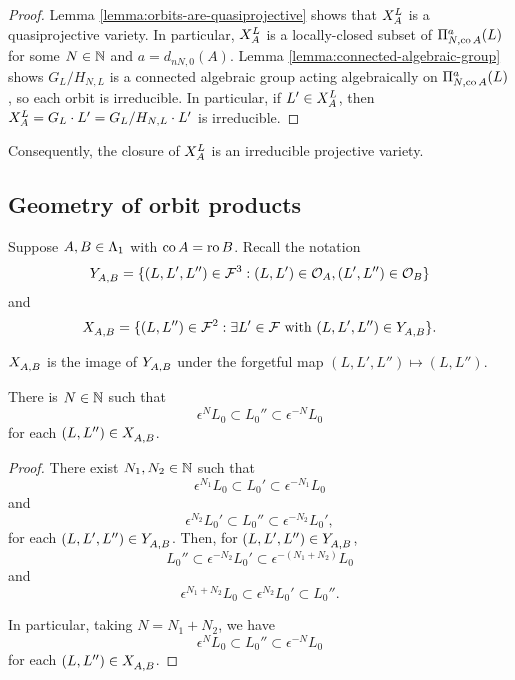 \documentclass[a4paper, 11pt]{report}
\begin{document}
\begin{proof}
Lemma \ref{lemma:orbits-are-quasiprojective} shows that $\xprod[L]{A}$ is a quasiprojective variety. In particular, $\xprod[L]{A}$ is a locally-closed subset of $\Pi_{N,\co{A}}^a(L)$ for some $N\in\naturals$ and $a=d_{nN,0}(A)$. Lemma \ref{lemma:connected-algebraic-group} shows $G_L/{H_{N,L}}$ is a connected algebraic group acting algebraically on $\Pi_{N,\co{A}}^a(L)$, so each orbit is irreducible. In particular, if $L'\in\xprod[L]{A}$, then $\xprod[L]{A}=G_L\cdot L'=G_L/{H_{N,L}}\cdot L'$ is irreducible.
\end{proof}

Consequently, the closure of $\xprod[L]{A}$ is an irreducible projective variety.

\subsection{Geometry of orbit products}

Suppose $A,B\in\matrices$ with $\co{A}=\ro{B}$. Recall the notation
\begin{equation*}
\yprod{A,B} = \{(L,L',L'')\in\flags^3: (L,L')\in\orbit{A}, (L',L'')\in\orbit{B}\}
\end{equation*}
and
\begin{equation*}
\xprod{A,B} = \{(L,L'')\in\flags^2:\exists L'\in\flags \text{ with } (L,L',L'')\in \yprod{A,B}\}.
\end{equation*}

$\xprod{A,B}$ is the image of $\yprod{A,B}$ under the forgetful map $(L,L',L'')\mapsto (L,L'')$.

\begin{lemma}\label{lemma:orbit-products-are-bounded}
There is $N\in\naturals$ such that
\begin{equation*}
\epsilon^N L_0\subset L_0''\subset \epsilon^{-N}L_0
\end{equation*}
for each $(L,L'')\in \xprod{A,B}$.
\end{lemma}

\begin{proof}
There exist $N_1,N_2\in\naturals$ such that
\begin{equation*}
\epsilon^{N_1}L_0\subset L_0'\subset \epsilon^{-N_1}L_0
\end{equation*}
and
\begin{equation*}
\epsilon^{N_2}L_0'\subset L_0''\subset \epsilon^{-N_2}L_0',
\end{equation*}
for each $(L,L',L'')\in \yprod{A,B}$. Then, for $(L,L',L'')\in \yprod{A,B}$,
\begin{equation*}
L_0''\subset \epsilon^{-N_2} L_0' \subset \epsilon^{-(N_1+N_2)} L_0
\end{equation*}
and
\begin{equation*}
\epsilon^{N_1+N_2}L_0\subset \epsilon^{N_2}L_0'\subset L_0''.
\end{equation*}

In particular, taking $N=N_1 + N_2$, we have
\begin{equation*}
\epsilon^N L_0 \subset L_0'' \subset \epsilon^{-N}L_0
\end{equation*}
for each $(L,L'')\in \xprod{A,B}$.
\end{proof}
\end{document}
